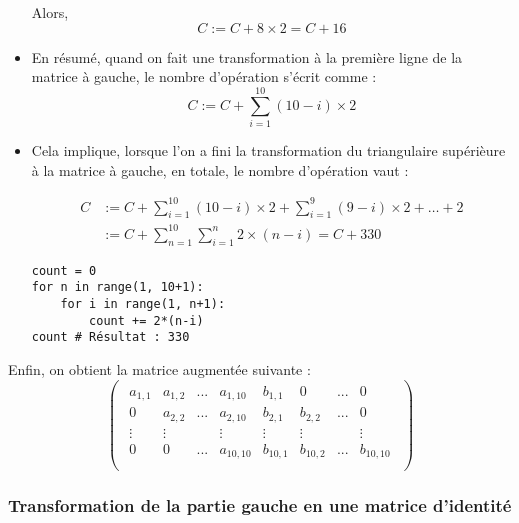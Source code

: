 \documentclass{article}
\begin{document}
\begin{itemize}
Alors, \[
C := C + 8 \times 2 = C + 16
\]

\item En résumé, quand on fait une transformation à la première ligne de la matrice à gauche, le nombre d'opération s'écrit comme :
    \[
    C := C + \sum_{i=1}^{10} (10-i) \times  2
    \]
\item Cela implique, lorsque l'on a fini la transformation du triangulaire supérièure à la matrice à gauche, en totale, le nombre d'opération vaut :
    \begin{tcolorbox}
    \begin{align*}
        C &:= C + \sum_{i=1}^{10} (10-i) \times  2 + \sum_{i=1}^{9} (9-i) \times  2 + \ldots + 2 \\
          &:= C + \sum_{n=1}^{10} \sum_{i=1}^{n} 2 \times (n-i) = C + 330
    \end{align*}
        
    \end{tcolorbox}

\begin{lstlisting}
count = 0
for n in range(1, 10+1):
    for i in range(1, n+1):
        count += 2*(n-i)
count # Résultat : 330
\end{lstlisting}

\end{itemize}

Enfin, on obtient la matrice augmentée suivante :
\[
\begin{pmatrix}
\begin{array}{cccc|cccc}
a_{1,1} & a_{1,2} & ... & a_{1,10} & b_{1,1} &0&... &0\\
0 & a_{2,2} & ... & a_{2,10} & b_{2,1} &b_{2,2} & ...&0\\
\vdots & \vdots & & \vdots & \vdots &\vdots & &\vdots\\
0 & 0 & ... & a_{10,10} & b_{10,1}& b_{10,2}&... & b_{10,10}\\
\end{array}
\end{pmatrix}
\]

\subsubsection{Transformation de la partie gauche en une matrice d'identité}
\end{document}
